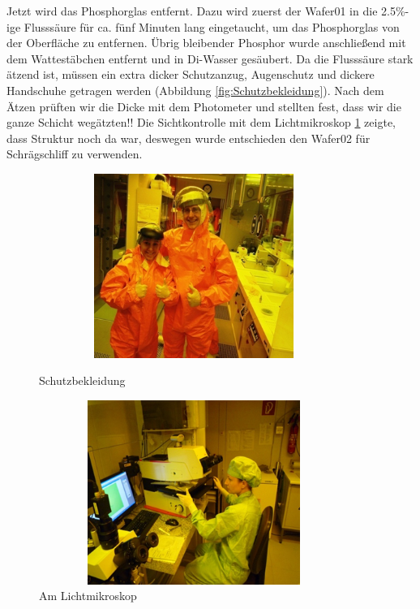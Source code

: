 Jetzt wird das Phosphorglas entfernt. Dazu wird zuerst der Wafer01 in die 2.5\%-ige Flusssäure für ca. fünf Minuten lang eingetaucht, um das Phosphorglas von der
Oberfläche zu entfernen. Übrig bleibender Phosphor wurde anschließend mit dem
Wattestäbchen entfernt und in Di-Wasser gesäubert.
Da die Flusssäure stark ätzend ist, müssen ein extra dicker Schutzanzug, Augenschutz und dickere Handschuhe getragen werden (Abbildung \ref{fig:Schutzbekleidung}). Nach dem Ätzen prüften wir die Dicke mit dem Photometer und stellten fest, dass wir die ganze Schicht wegätzten!! Die Sichtkontrolle mit dem Lichtmikroskop \ref{fig:ArbeitenamLichtmikroskop} zeigte, dass Struktur noch da war, deswegen wurde entschieden den Wafer02 für Schrägschliff zu verwenden.


\begin{figure}[H]
\centering
\begin{minipage}[hbt]{7cm}
    \centering
    \includegraphics[width=0.9\textwidth, height=6cm]{bilder/Schutzbekleidung.png}
  \caption{Schutzbekleidung}
  \label{fig:Schutzbekleidung}
\end{minipage}
\begin{minipage}[hbt]{7cm}
    \centering
    \includegraphics[width=0.9\textwidth,height=6cm]{bilder/ArbeitenamLichtmikroskop.png}
  \caption{Am Lichtmikroskop}
  \label{fig:ArbeitenamLichtmikroskop}
\end{minipage}

\end{figure}


